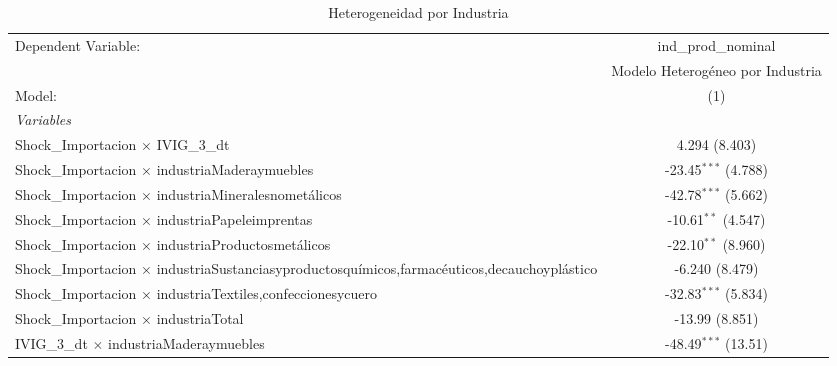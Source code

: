 \documentclass[12pt]{article}
\begin{document}
\begin{table}[htbp]
\centering
\begin{threeparttable}

   \caption{Heterogeneidad por Industria}
   \centering
   \small
   \begin{tabular}{lc}
      \tabularnewline \midrule \midrule
      Dependent Variable:                                                                                                         & ind\_prod\_nominal\\    
                                                                                                                                  & Modelo Heterogéneo por Industria \\   
      Model:                                                                                                                      & (1)\\  
      \midrule
      \emph{Variables}\\
      Shock\_Importacion $\times$ IVIG\_3\_dt                                                                                     & 4.294 (8.403)\\   
      Shock\_Importacion $\times$ industriaMaderaymuebles                                                                         & -23.45$^{***}$ (4.788)\\   
      Shock\_Importacion $\times$ industriaMineralesnometálicos                                                                   & -42.78$^{***}$ (5.662)\\   
      Shock\_Importacion $\times$ industriaPapeleimprentas                                                                        & -10.61$^{**}$ (4.547)\\   
      Shock\_Importacion $\times$ industriaProductosmetálicos                                                                     & -22.10$^{**}$ (8.960)\\   
      Shock\_Importacion $\times$ industriaSustanciasyproductosquímicos,farmacéuticos,decauchoyplástico                           & -6.240 (8.479)\\   
      Shock\_Importacion $\times$ industriaTextiles,confeccionesycuero                                                            & -32.83$^{***}$ (5.834)\\   
      Shock\_Importacion $\times$ industriaTotal                                                                                  & -13.99 (8.851)\\   
      IVIG\_3\_dt $\times$ industriaMaderaymuebles                                                                                & -48.49$^{***}$ (13.51)\\   

\end{tabular}
\end{threeparttable}
\end{table}
\end{document}
